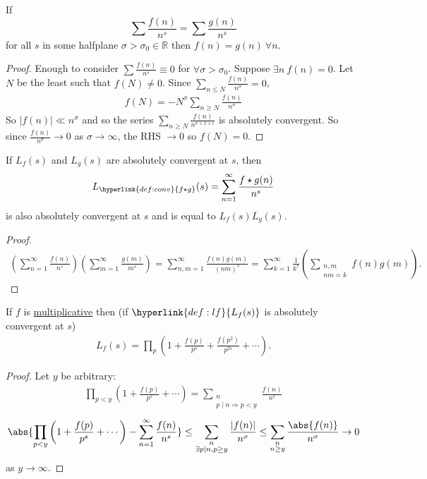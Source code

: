 \documentclass{article}
\begin{document}
\begin{nlemma}
  If
  \begin{equation*}
  \sum \frac{f(n)}{n^s} = \sum \frac{g(n)}{n^s}
  \end{equation*}
  for all $s$ in some halfplane $\sigma > \sigma_0 \in \mathbb{R}$ then $f(n) = g(n)\ \forall n$.
\end{nlemma}
\begin{proof}
  Enough to consider $\sum \frac{f(n)}{n^s} \equiv 0$ for $\forall \sigma > \sigma_0$.
  Suppose $\exists n\ f(n) = 0$. Let $N$ be the least such that $f(N) \neq 0$.
  Since $\sum_{n \leq N} \frac{f(n)}{n^\sigma} = 0$,
  \begin{align*}
    f(N) = -N^\sigma \sum_{n \geq N} \frac{f(n)}{n^\sigma}
  \end{align*}
  So $|f(n)| \ll n^\sigma$ and so the series $\sum_{n \geq N} \frac{f(n)}{n^{\sigma+1+\epsilon}}$ is absolutely convergent.
  So since $\frac{f(n)}{n^\sigma} \to 0$ as $\sigma \to \infty$, the RHS $\to 0$ so $f(N) = 0$.
\end{proof}
\begin{nlemma}
  If \hyperlink{def:lf}{$L_f(s)$} and $L_g(s)$ are absolutely convergent at $s$, then
  \begin{align*}
    L_{\hyperlink{def:conv}{f \star g}}(s) = \sum_{n =1}^\infty \frac{f \star g(n)}{n^s}
  \end{align*}
  is also absolutely convergent at $s$ and is equal to $L_f(s) L_g(s)$.
\end{nlemma}
\begin{proof}
  \begin{align*}
    \left(\sum_{n=1}^\infty \frac{f(n)}{n^s}\right)\left(\sum_{m=1}^\infty \frac{g(m)}{m^s}\right) = \sum_{n,m=1}^\infty \frac{f(n)g(m)}{(nm)^s} = \sum_{k=1}^\infty \frac{1}{k^s} \left(\sum_{\substack{n,m\\ nm=k}} f(n) g(m)\right).
  \end{align*}
\end{proof}
\begin{nlemma}
  If $f$ is \hyperlink{def:multi}{multiplicative} then (if $\hyperlink{def:lf}{L_f(s)}$ is absolutely convergent at $s$)
  \begin{align*}
    L_f(s) = \prod_p \left(1 + \frac{f(p)}{p^s} + \frac{f(p^2)}{p^{2s}} + \dotsb\right).
  \end{align*}
\end{nlemma}
\begin{proof}
  Let $y$ be arbitrary:
  \begin{align*}
    \prod_{p < y} \left(1 + \frac{f(p)}{p^s} + \dotsb\right) = \sum_{\substack{n \\ p \mid n \Rightarrow p < y}} \frac{f(n)}{n^s}
  \end{align*}
  \begin{align*}
    \abs{\prod_{p < y} \left(1 + \frac{f(p)}{p^s} + \dotsb\right) - \sum_{n=1}^\infty \frac{f(n)}{n^s}} \leq \sum_{\substack{n \\ \exists p \mid n, p \geq y}} \frac{|f(n)|}{n^\sigma} \leq \sum_{\substack{n \\ n \geq y}} \frac{\abs{f(n)}}{n^\sigma} \to 0
  \end{align*}
  as $y \to \infty$.
\end{proof}
\end{document}
